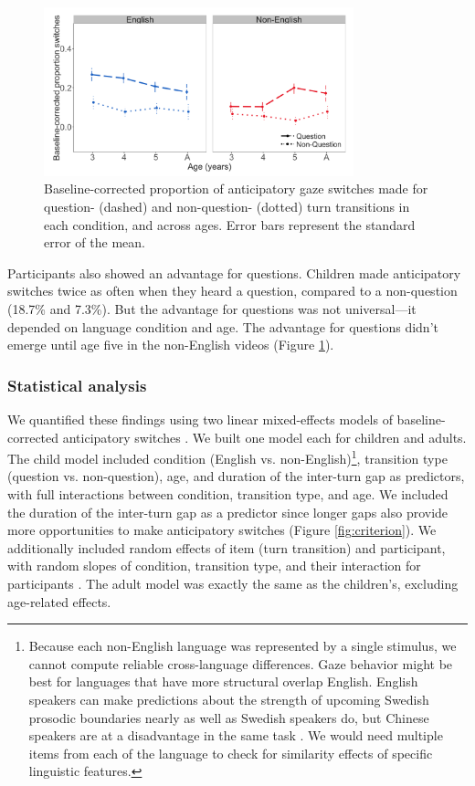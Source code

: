 \documentclass[authoryear, 12pt]{elsarticle}
\begin{document}
\begin{figure}[t]
\begin{center}
\includegraphics[width=0.8\textwidth]{figures/FIG-QvsNQ-FL.png}
\end{center}
\caption{Baseline-corrected proportion of anticipatory gaze switches made for question- (dashed) and non-question- (dotted) turn transitions in each condition, and across ages. Error bars represent the standard error of the mean.} 
\label{fig:questionsFL}
\end{figure}

Participants also showed an advantage for questions. Children made anticipatory switches twice as often when they heard a question, compared to a non-question (18.7\% and 7.3\%). But the advantage for questions was not universal---it depended on language condition and age. The advantage for questions didn't emerge until age five in the non-English videos (Figure \ref{fig:questionsFL}).

\subsubsection{Statistical analysis}

We quantified these findings using two linear mixed-effects models of baseline-corrected anticipatory switches \citep{lme4, R}. We built one model each for children and adults. The child model included condition (English vs. non-English)\footnote{Because each non-English language was represented by a single stimulus, we cannot compute reliable cross-language differences. Gaze behavior might be best for languages that have more structural overlap English. English speakers can make predictions about the strength of upcoming Swedish prosodic boundaries nearly as well as Swedish speakers do, but Chinese speakers are at a disadvantage in the same task \cite{carlson2005}. We would need multiple items from each of the language to check for similarity effects of specific linguistic features.}, transition type (question vs. non-question), age, and duration of the inter-turn gap as predictors, with full interactions between condition, transition type, and age.  We included the duration of the inter-turn gap as a predictor since longer gaps also provide more opportunities to make anticipatory switches (Figure \ref{fig:criterion}). We additionally included random effects of item (turn transition) and participant, with random slopes of condition, transition type, and their interaction for participants \citep{barr2013}. The adult model was exactly the same as the children's, excluding age-related effects.
\end{document}
